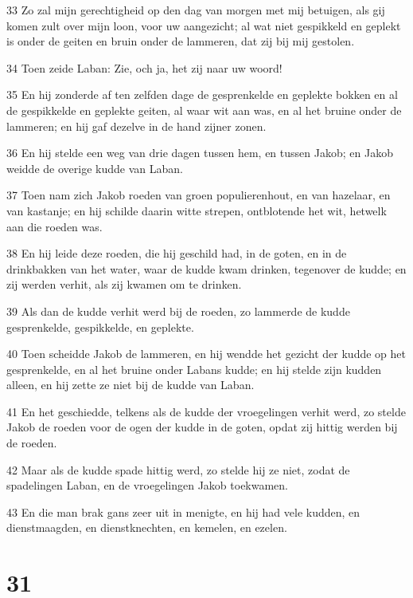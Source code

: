 \par 33 Zo zal mijn gerechtigheid op den dag van morgen met mij betuigen, als gij komen zult over mijn loon, voor uw aangezicht; al wat niet gespikkeld en geplekt is onder de geiten en bruin onder de lammeren, dat zij bij mij gestolen.
\par 34 Toen zeide Laban: Zie, och ja, het zij naar uw woord!
\par 35 En hij zonderde af ten zelfden dage de gesprenkelde en geplekte bokken en al de gespikkelde en geplekte geiten, al waar wit aan was, en al het bruine onder de lammeren; en hij gaf dezelve in de hand zijner zonen.
\par 36 En hij stelde een weg van drie dagen tussen hem, en tussen Jakob; en Jakob weidde de overige kudde van Laban.
\par 37 Toen nam zich Jakob roeden van groen populierenhout, en van hazelaar, en van kastanje; en hij schilde daarin witte strepen, ontblotende het wit, hetwelk aan die roeden was.
\par 38 En hij leide deze roeden, die hij geschild had, in de goten, en in de drinkbakken van het water, waar de kudde kwam drinken, tegenover de kudde; en zij werden verhit, als zij kwamen om te drinken.
\par 39 Als dan de kudde verhit werd bij de roeden, zo lammerde de kudde gesprenkelde, gespikkelde, en geplekte.
\par 40 Toen scheidde Jakob de lammeren, en hij wendde het gezicht der kudde op het gesprenkelde, en al het bruine onder Labans kudde; en hij stelde zijn kudden alleen, en hij zette ze niet bij de kudde van Laban.
\par 41 En het geschiedde, telkens als de kudde der vroegelingen verhit werd, zo stelde Jakob de roeden voor de ogen der kudde in de goten, opdat zij hittig werden bij de roeden.
\par 42 Maar als de kudde spade hittig werd, zo stelde hij ze niet, zodat de spadelingen Laban, en de vroegelingen Jakob toekwamen.
\par 43 En die man brak gans zeer uit in menigte, en hij had vele kudden, en dienstmaagden, en dienstknechten, en kemelen, en ezelen.

\chapter{31}


